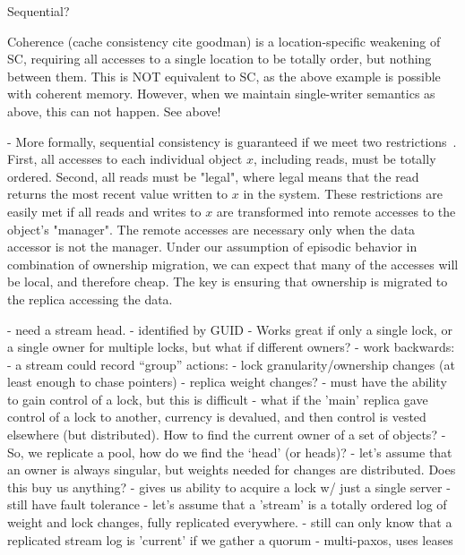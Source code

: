 Sequential?

Coherence (cache consistency cite goodman) is a location-specific
  weakening of SC, requiring all accesses to a single location to be
  totally order, but nothing between them.  This is NOT equivalent to SC, as the
  above example is possible with coherent memory.  However, when we
  maintain single-writer semantics as above, this can not happen.  See
  above!

- More formally, sequential consistency is guaranteed if we meet two restrictions~\cite{lazySC}. 
First, all accesses to each individual object $x$, including reads, must be totally ordered. 
Second, all reads must be "legal", where legal means that the read returns the most recent value
written to $x$ in the system. These restrictions are easily met if all reads and writes to $x$ are 
transformed into remote accesses to the object's "manager". The remote accesses are necessary
only when the data accessor is not the manager. Under our assumption of episodic behavior in
combination of ownership migration, we can expect that many of the accesses will be local, and therefore
cheap. The key is ensuring that ownership is migrated to the replica accessing the data.

- need a stream head. 
  - identified by GUID
  - Works great if only a single lock, or a single
    owner for multiple locks, but what if different owners?
  - work backwards:
    - a stream could record ``group'' actions:
      - lock granularity/ownership changes (at least enough to chase pointers)
      - replica weight changes?
      - must have the ability to gain control of a lock, but this is difficult
        - what if the 'main' replica gave control of a lock to
          another, currency is devalued, and then control is vested
          elsewhere (but distributed). How to find the current owner
          of a set of objects?
        - So, we replicate a pool, how do we find the `head' (or
          heads)?
  - let's assume that an owner is always singular, but weights needed
    for changes are distributed. Does this buy us anything?
    - gives us ability to acquire a lock w/ just a single server
    - still have fault tolerance
  - let's assume that a 'stream' is a totally ordered log of weight
    and lock changes, fully replicated everywhere. 
    - still can only know that a replicated stream log is 'current' if
      we gather a quorum
      - multi-paxos, uses leases

